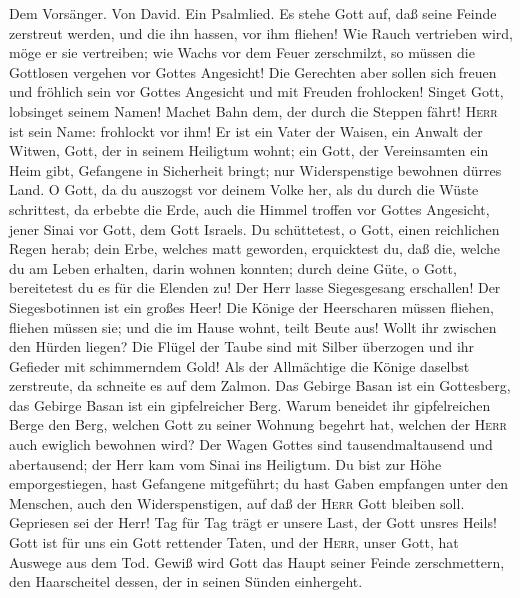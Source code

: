  Dem Vorsänger. Von David. Ein Psalmlied. Es stehe Gott
auf, daß seine Feinde zerstreut werden, und die ihn hassen, vor ihm
fliehen!  Wie Rauch vertrieben wird, möge er sie
vertreiben; wie Wachs vor dem Feuer zerschmilzt, so müssen die Gottlosen
vergehen vor Gottes Angesicht!  Die Gerechten aber sollen
sich freuen und fröhlich sein vor Gottes Angesicht und mit Freuden
frohlocken!  Singet Gott, lobsinget seinem Namen! Machet
Bahn dem, der durch die Steppen fährt! \textsc{Herr} ist sein Name:
frohlockt vor ihm!  Er ist ein Vater der Waisen, ein
Anwalt der Witwen, Gott, der in seinem Heiligtum wohnt; 
ein Gott, der Vereinsamten ein Heim gibt, Gefangene in Sicherheit
bringt; nur Widerspenstige bewohnen dürres Land.  O Gott,
da du auszogst vor deinem Volke her, als du durch die Wüste schrittest,
 da erbebte die Erde, auch die Himmel troffen vor Gottes
Angesicht, jener Sinai vor Gott, dem Gott Israels.  Du
schüttetest, o Gott, einen reichlichen Regen herab; dein Erbe, welches
matt geworden, erquicktest du,  daß die, welche du am
Leben erhalten, darin wohnen konnten; durch deine Güte, o Gott,
bereitetest du es für die Elenden zu!  Der Herr lasse
Siegesgesang erschallen! Der Siegesbotinnen ist ein großes Heer!
 Die Könige der Heerscharen müssen fliehen, fliehen
müssen sie; und die im Hause wohnt, teilt Beute aus! 
Wollt ihr zwischen den Hürden liegen? Die Flügel der Taube sind mit
Silber überzogen und ihr Gefieder mit schimmerndem Gold! 
Als der Allmächtige die Könige daselbst zerstreute, da schneite es auf
dem Zalmon.  Das Gebirge Basan ist ein Gottesberg, das
Gebirge Basan ist ein gipfelreicher Berg.  Warum beneidet
ihr gipfelreichen Berge den Berg, welchen Gott zu seiner Wohnung begehrt
hat, welchen der \textsc{Herr} auch ewiglich bewohnen wird?
 Der Wagen Gottes sind tausendmaltausend und abertausend;
der Herr kam vom Sinai ins Heiligtum.  Du bist zur Höhe
emporgestiegen, hast Gefangene mitgeführt; du hast Gaben empfangen unter
den Menschen, auch den Widerspenstigen, auf daß der \textsc{Herr} Gott
bleiben soll.  Gepriesen sei der Herr! Tag für Tag trägt
er unsere Last, der Gott unsres Heils!  Gott ist für uns
ein Gott rettender Taten, und der \textsc{Herr}, unser Gott, hat Auswege
aus dem Tod.  Gewiß wird Gott das Haupt seiner Feinde
zerschmettern, den Haarscheitel dessen, der in seinen Sünden einhergeht.
